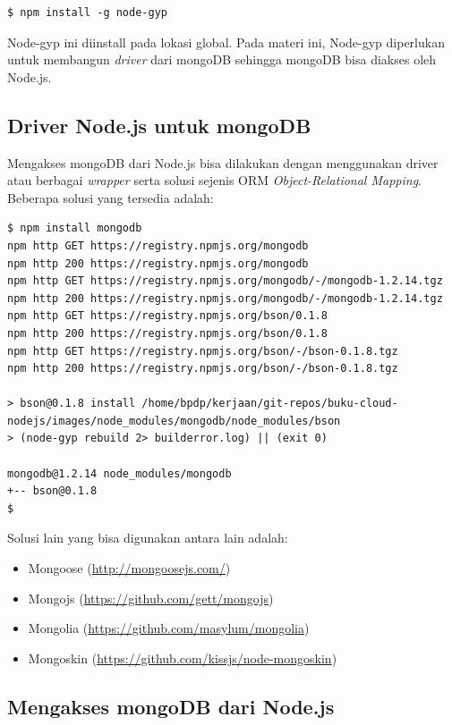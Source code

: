 \lstset{language=bash,caption=Instalasi node-gyp}
\begin{lstlisting}
$ npm install -g node-gyp
\end{lstlisting}

Node-gyp ini diinstall pada lokasi global. Pada materi ini, Node-gyp diperlukan untuk membangun \textit{driver} dari mongoDB sehingga mongoDB bisa diakses oleh Node.js. 

\subsection{Driver Node.js untuk mongoDB}

Mengakses mongoDB dari Node.js bisa dilakukan dengan menggunakan driver atau berbagai \textit{wrapper} serta solusi sejenis ORM \textit{Object-Relational Mapping}. Beberapa solusi yang tersedia adalah:
\lstset{language=bash,caption=Instalasi driver mongoDB}
\begin{lstlisting}
$ npm install mongodb
npm http GET https://registry.npmjs.org/mongodb
npm http 200 https://registry.npmjs.org/mongodb
npm http GET https://registry.npmjs.org/mongodb/-/mongodb-1.2.14.tgz
npm http 200 https://registry.npmjs.org/mongodb/-/mongodb-1.2.14.tgz
npm http GET https://registry.npmjs.org/bson/0.1.8
npm http 200 https://registry.npmjs.org/bson/0.1.8
npm http GET https://registry.npmjs.org/bson/-/bson-0.1.8.tgz
npm http 200 https://registry.npmjs.org/bson/-/bson-0.1.8.tgz

> bson@0.1.8 install /home/bpdp/kerjaan/git-repos/buku-cloud-nodejs/images/node_modules/mongodb/node_modules/bson
> (node-gyp rebuild 2> builderror.log) || (exit 0)

mongodb@1.2.14 node_modules/mongodb
+-- bson@0.1.8
$
\end{lstlisting}

Solusi lain yang bisa digunakan antara lain adalah:
\begin{itemize}
	\item Mongoose (\url{http://mongoosejs.com/})
	\item Mongojs (\url{https://github.com/gett/mongojs})
	\item Mongolia (\url{https://github.com/masylum/mongolia})
	\item Mongoskin (\url{https://github.com/kissjs/node-mongoskin})
\end{itemize}

\subsection{Mengakses mongoDB dari Node.js}

